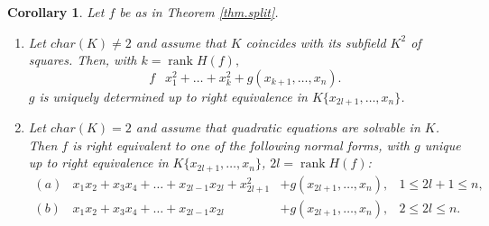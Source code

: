 \documentclass[11pt]{article}
\DeclareMathOperator{\rank}{rank}
\DeclareMathOperator{\rsim}{\stackrel{r}{\sim}}
\newtheorem{Corollary}[Definition]{Corollary}
\begin{document}
\begin{Corollary} \label{cor.split}
Let $f$ be as in Theorem \ref{thm.split}.
\begin{enumerate}
\item Let $char(K)\ne 2$ and assume that $K$ coincides with its subfield $K^2$ of squares. Then, with $k=\rank H(f),$ 
  $$ f\ \rsim x_1^2+\ldots+x_k^2+g(x_{k+1},\dots,x_n). $$
$g$ is uniquely determined up to  right equivalence in $K\{x_{2l+1},\ldots,x_{n}\}$. 
\item  Let $char(K) = 2$ and assume that quadratic equations are solvable in $K$. Then  $f$ is right equivalent to one of the following normal forms, with $g$ unique up to right equivalence in $K\{x_{2l+1},\ldots,x_{n}\}$, $2l=\rank H(f)$:
$$
\begin{array}{llll}
(a) & x_1x_2+x_3x_4+\ldots+x_{2l-1}x_{2l}+x_{2l+1}^2 &+g(x_{2l+1},\ldots,x_{n}), & 1\le  2l+1 \le n,\\
(b)& x_1x_2+x_3x_4+\ldots+x_{2l-1}x_{2l} &+ g(x_{2l+1},\ldots,x_{n}),  & 2 \le 2l \le n.
\end{array}
$$
\end{enumerate}
\end{Corollary}
\end{document}
